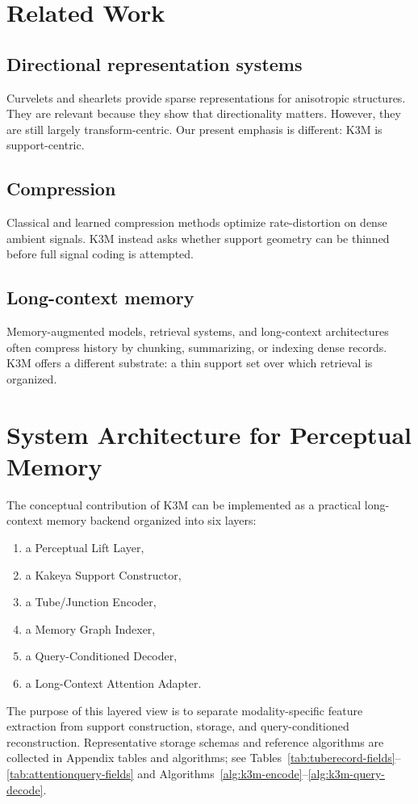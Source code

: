 \documentclass[11pt]{article}
\begin{document}
\section{Related Work}
\subsection{Directional representation systems}
Curvelets and shearlets provide sparse representations for anisotropic structures. They are relevant because they show that directionality matters. However, they are still largely transform-centric. Our present emphasis is different: K3M is support-centric.

\subsection{Compression}
Classical and learned compression methods optimize rate-distortion on dense ambient signals. K3M instead asks whether support geometry can be thinned before full signal coding is attempted.

\subsection{Long-context memory}
Memory-augmented models, retrieval systems, and long-context architectures often compress history by chunking, summarizing, or indexing dense records. K3M offers a different substrate: a thin support set over which retrieval is organized.

\section{System Architecture for Perceptual Memory}
The conceptual contribution of K3M can be implemented as a practical long-context memory backend organized into six layers:
\begin{enumerate}[leftmargin=1.5em]
\item a Perceptual Lift Layer,
\item a Kakeya Support Constructor,
\item a Tube/Junction Encoder,
\item a Memory Graph Indexer,
\item a Query-Conditioned Decoder,
\item a Long-Context Attention Adapter.
\end{enumerate}
The purpose of this layered view is to separate modality-specific feature extraction from support construction, storage, and query-conditioned reconstruction.
Representative storage schemas and reference algorithms are collected in Appendix tables and algorithms; see Tables~\ref{tab:tuberecord-fields}--\ref{tab:attentionquery-fields} and Algorithms~\ref{alg:k3m-encode}--\ref{alg:k3m-query-decode}.
\end{document}
